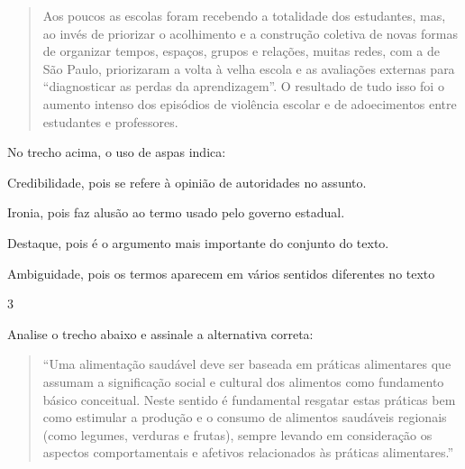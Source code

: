\begin{quote}
Aos poucos as escolas foram recebendo a totalidade dos estudantes, mas,
ao invés de priorizar o acolhimento e a construção coletiva de novas
formas de organizar tempos, espaços, grupos e relações, muitas redes,
com a de São Paulo, priorizaram a volta à velha escola e as avaliações
externas para ``diagnosticar as perdas da aprendizagem''. O resultado de
tudo isso foi o aumento intenso dos episódios de violência escolar e de
adoecimentos entre estudantes e professores.
\end{quote}


No trecho acima, o uso de aspas indica:

\begin{escolha}

  \item Credibilidade, pois se refere à opinião de autoridades no assunto.

  \item Ironia, pois faz alusão ao termo usado pelo governo estadual.

  \item Destaque, pois é o argumento mais importante do conjunto do texto.

  \item Ambiguidade, pois os termos aparecem em vários sentidos diferentes no texto

\end{escolha}

\num{3}

Analise o trecho abaixo e assinale a alternativa correta:

\begin{quote}

``Uma alimentação saudável deve ser baseada em práticas alimentares que
assumam a significação social e cultural dos alimentos como fundamento
básico conceitual. Neste sentido é fundamental resgatar estas práticas
bem como estimular a produção e o consumo de alimentos saudáveis
regionais (como legumes, verduras e frutas), sempre levando em
consideração os aspectos comportamentais e afetivos relacionados às
práticas alimentares.''

\end{quote}


